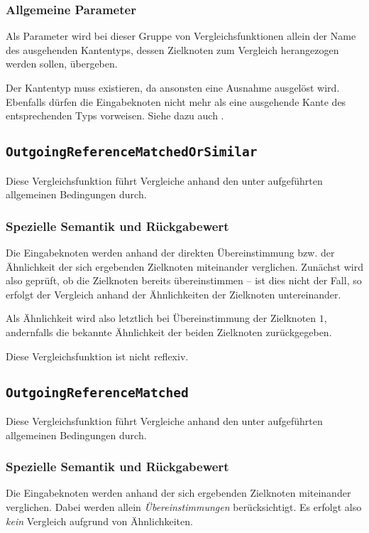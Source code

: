 \subsubsection*{Allgemeine Parameter}
Als Parameter wird bei dieser Gruppe von Vergleichsfunktionen allein der Name des ausgehenden Kantentyps, dessen Zielknoten zum Vergleich herangezogen werden sollen, übergeben.

 Der Kantentyp muss existieren, da ansonsten eine Ausnahme ausgelöst wird. Ebenfalls dürfen die Eingabeknoten nicht mehr als eine ausgehende Kante des entsprechenden Typs vorweisen. Siehe dazu auch .


\newpage
%
%
\subsection{\texttt{OutgoingReferenceMatchedOrSimilar}}
Diese Vergleichsfunktion führt Vergleiche anhand den unter\mylinebreak{} aufgeführten allgemeinen Bedingungen durch.

\subsubsection*{Spezielle Semantik und Rückgabewert}
Die Eingabeknoten werden anhand der direkten Übereinstimmung bzw. der Ähnlichkeit der sich ergebenden Zielknoten miteinander verglichen. Zunächst wird also geprüft, ob die Zielknoten bereits übereinstimmen -- ist dies nicht der Fall, so erfolgt der Vergleich anhand der Ähnlichkeiten der Zielknoten untereinander.

Als Ähnlichkeit wird also letztlich bei Übereinstimmung der Zielknoten $1$, andernfalls die bekannte Ähnlichkeit der beiden Zielknoten zurückgegeben.

 Diese Vergleichsfunktion ist nicht reflexiv.


%
%
\subsection{\texttt{OutgoingReferenceMatched}}
Diese Vergleichsfunktion führt Vergleiche anhand den unter\mylinebreak{} aufgeführten allgemeinen Bedingungen durch.

\subsubsection*{Spezielle Semantik und Rückgabewert}
Die Eingabeknoten werden anhand der sich ergebenden Zielknoten miteinander verglichen. Dabei werden allein \emph{Übereinstimmungen} berücksichtigt. Es erfolgt also \emph{kein} Vergleich aufgrund von Ähnlichkeiten.

